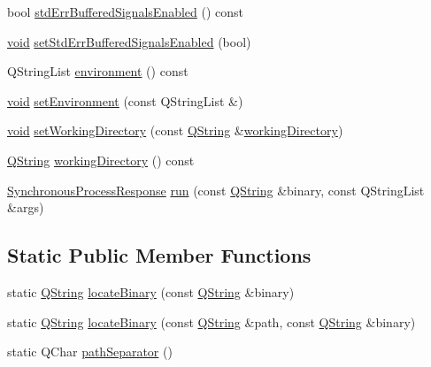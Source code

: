 \begin{DoxyCompactItemize}
bool \hyperlink{class_utils_1_1_synchronous_process_aaa756ec7b46e9c0ed210de1b45138958}{std\-Err\-Buffered\-Signals\-Enabled} () const 
\item 
\hyperlink{group___u_a_v_objects_plugin_ga444cf2ff3f0ecbe028adce838d373f5c}{void} \hyperlink{class_utils_1_1_synchronous_process_a2266d1d25c1c56259843580ec8ac8bc2}{set\-Std\-Err\-Buffered\-Signals\-Enabled} (bool)
\item 
Q\-String\-List \hyperlink{class_utils_1_1_synchronous_process_a1954e54fe53020fc0ef8d9d7c622c872}{environment} () const 
\item 
\hyperlink{group___u_a_v_objects_plugin_ga444cf2ff3f0ecbe028adce838d373f5c}{void} \hyperlink{class_utils_1_1_synchronous_process_aadedd5baae795c6f5f866f0ca1b08574}{set\-Environment} (const Q\-String\-List \&)
\item 
\hyperlink{group___u_a_v_objects_plugin_ga444cf2ff3f0ecbe028adce838d373f5c}{void} \hyperlink{class_utils_1_1_synchronous_process_aa174d043ac6c3aa21358858e13d46a2c}{set\-Working\-Directory} (const \hyperlink{group___u_a_v_objects_plugin_gab9d252f49c333c94a72f97ce3105a32d}{Q\-String} \&\hyperlink{class_utils_1_1_synchronous_process_a736699b179a07d0e04ccc6cdeef7f55f}{working\-Directory})
\item 
\hyperlink{group___u_a_v_objects_plugin_gab9d252f49c333c94a72f97ce3105a32d}{Q\-String} \hyperlink{class_utils_1_1_synchronous_process_a736699b179a07d0e04ccc6cdeef7f55f}{working\-Directory} () const 
\item 
\hyperlink{struct_utils_1_1_synchronous_process_response}{Synchronous\-Process\-Response} \hyperlink{class_utils_1_1_synchronous_process_a37f589d3b02afb7d8f14ee1f8cb11e24}{run} (const \hyperlink{group___u_a_v_objects_plugin_gab9d252f49c333c94a72f97ce3105a32d}{Q\-String} \&binary, const Q\-String\-List \&args)
\end{DoxyCompactItemize}
\subsection*{Static Public Member Functions}
\begin{DoxyCompactItemize}
\item 
static \hyperlink{group___u_a_v_objects_plugin_gab9d252f49c333c94a72f97ce3105a32d}{Q\-String} \hyperlink{class_utils_1_1_synchronous_process_aa16c0d57a35c3526cd891529c079e8eb}{locate\-Binary} (const \hyperlink{group___u_a_v_objects_plugin_gab9d252f49c333c94a72f97ce3105a32d}{Q\-String} \&binary)
\item 
static \hyperlink{group___u_a_v_objects_plugin_gab9d252f49c333c94a72f97ce3105a32d}{Q\-String} \hyperlink{class_utils_1_1_synchronous_process_a1a1fb07186fc812eeb0e8624ad2d1d35}{locate\-Binary} (const \hyperlink{group___u_a_v_objects_plugin_gab9d252f49c333c94a72f97ce3105a32d}{Q\-String} \&path, const \hyperlink{group___u_a_v_objects_plugin_gab9d252f49c333c94a72f97ce3105a32d}{Q\-String} \&binary)
\item 
static Q\-Char \hyperlink{class_utils_1_1_synchronous_process_adc0ff980620acd3fbbea36bdb998c406}{path\-Separator} ()
\end{DoxyCompactItemize}


